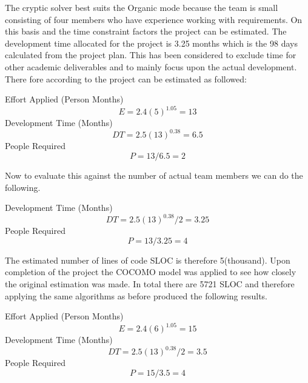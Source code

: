The cryptic solver best suits the Organic mode because the team is small consisting of four members who have experience working with requirements. On this basis and the time constraint factors the project can be estimated. The development time allocated for the project is 3.25 months which is the 98 days calculated from the project plan. This has been considered to exclude time for other academic deliverables and to mainly focus upon the actual development. There fore according to \citet{cocomo2} the project can be estimated as followed:

Effort Applied (Person Months)
\[
	E=2.4(5)^{1.05} = 13
\]
Development Time (Months)
\[
	DT=2.5(13)^{0.38} = 6.5 
\]
People Required
\[
	P=13/6.5 = 2
\]

Now to evaluate this against the number of actual team members we can do the following.

Development Time (Months)
\[
	DT=2.5(13)^{0.38}/2 = 3.25
\]
People Required
\[
	P=13/3.25 = 4
\]


The estimated number of lines of code SLOC is therefore 5(thousand). Upon completion of the project the COCOMO model was applied to see how closely the original estimation was made. In total there are 5721 SLOC and therefore applying the same algorithms as before produced the following results.

Effort Applied (Person Months)
\[
	E=2.4(6)^{1.05} = 15
\]
Development Time (Months)
\[
	DT=2.5(13)^{0.38}/2 = 3.5
\]
People Required
\[
	P=15/3.5 = 4
\]




